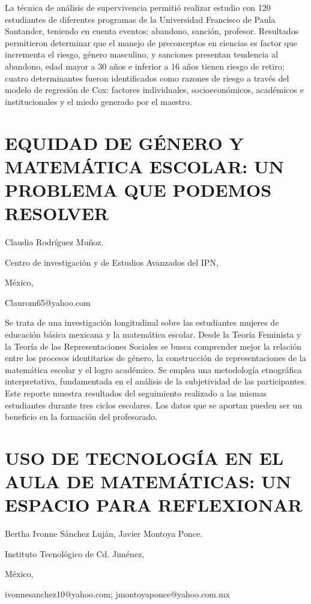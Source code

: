 La técnica de análisis de supervivencia permitió realizar estudio
con 120 estudiantes de diferentes programas de la Universidad Francisco
de Paula Santander, teniendo en cuenta eventos: abandono, sanción,
profesor. Resultados permitieron determinar que el manejo de preconceptos
en ciencias es factor que incrementa el riesgo, género masculino,
y sanciones presentan tendencia al abandono, edad mayor a 30 años
e inferior a 16 años tienen riesgo de retiro; cuatro determinantes
fueron identificados como razones de riesgo a través del modelo de
regresión de Cox: factores individuales, socioeconómicos, académicos
e institucionales y el miedo generado por el maestro.


\section{EQUIDAD DE GÉNERO Y MATEMÁTICA ESCOLAR: UN PROBLEMA QUE PODEMOS RESOLVER}

\begin{datos}

Claudia Rodríguez Muñoz.

Centro de investigación y de Estudios Avanzados del IPN,

México,

Claurom65@yahoo.com 

\end{datos}

Se trata de una investigación longitudinal sobre las estudiantes mujeres
de educación básica mexicana y la matemática escolar. Desde la Teoría
Feminista y la Teoría de las Representaciones Sociales se busca comprender
mejor la relación entre los procesos identitarios de género, la construcción
de representaciones de la matemática escolar y el logro académico.
Se emplea una metodología etnográfica interpretativa, fundamentada
en el análisis de la subjetividad de las participantes. Este reporte
muestra resultados del seguimiento realizado a las mismas estudiantes
durante tres ciclos escolares. Los datos que se aportan pueden ser
un beneficio en la formación del profesorado. 


\section{USO DE TECNOLOGÍA EN EL AULA DE MATEMÁTICAS: UN ESPACIO PARA REFLEXIONAR }

\begin{datos}

Bertha Ivonne Sánchez Luján, Javier Montoya Ponce.

Instituto Tecnológico de Cd. Jiménez, 

México,

ivonnesanchez10@yahoo.com; jmontoyaponce@yahoo.com.mx 

\end{datos}

